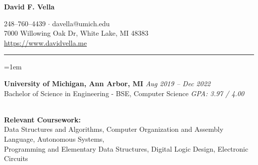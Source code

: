 \documentclass[12pt]{article}
\newcommand{\rheader}[1] { 
    \noindent{ 
        \large 
        \textbf{#1} 
        \par 
    }
    \vspace{-10pt}
    \noindent 
    \rule{7.5in}{0.5pt} 
}
\newcommand{\rdate}[1] {
    \hfill 
    \textit{#1}
}
\newcommand{\ritem} {
    \vspace{-10pt} 
    \item
}
\newcommand{\rurl}[1] {
	\textcolor{blue} {
        \small{
            \uline{
                \url{#1}
            }
        }
    }
}
\newenvironment{rsection} {
    \vspace{-5pt}
    \par 
    \medskip
    \leftskip=1em
    \noindent 
    \ignorespaces
} {
    \par 
    \medskip
    \vspace{5pt}
}
\newenvironment{rlist} {
    \begin{enumerate}[leftmargin=0.5in, label=$\bullet$]
} {
    \end{enumerate}
    \vspace{-10pt}
}
\begin{document}


\begin{center} %
    {\Large \textbf{David F. Vella} \par}
    \vspace{5pt}
    248--760--4439 $\cdot$ davella@umich.edu \\
    7000 Willowing Oak Dr, White Lake, MI 48383 \\
    \rurl{https://www.davidvella.me}
\end{center}
\vspace{-10pt}


\rheader{EDUCATION}
\begin{rsection}
    \textbf{University of Michigan, Ann Arbor, MI} \rdate{Aug 2019 -- Dec 2022} \\
    Bachelor of Science in Engineering - BSE, Computer Science \rdate{GPA: 3.97 / 4.00}
    \vspace{5pt} \\
    \noindent \textbf{Relevant Coursework:} \\
    Data Structures and Algorithms, Computer Organization and Assembly Language, Autonomous Systems, \\
    Programming and Elementary Data Structures, Digital Logic Design, Electronic Circuits

\end{rsection}
\end{document}
